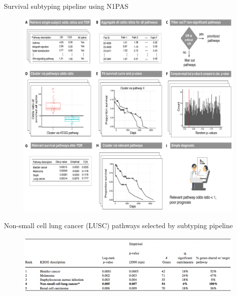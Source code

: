 \documentclass[ignorenonframetext,aspectratio=169,]{beamer}
\begin{document}
\begin{frame}{%
\protect\hypertarget{survival-subtyping-pipeline-using-n1pas}{%
Survival subtyping pipeline using N1PAS}}

\begin{figure}[htb]
  \centering \includegraphics[keepaspectratio,width=\textwidth,height=0.8\textheight]{../n1pas/figures/Figure2.jpg}
\end{figure}

\end{frame}

\begin{frame}{%
\protect\hypertarget{non-small-cell-lung-cancer-lusc-pathways-selected-by-subtyping-pipeline}{%
Non-small cell lung cancer (LUSC) pathways selected by subtyping
pipeline}}

\begin{figure}[htb]
  \centering \includegraphics[keepaspectratio,width=\textwidth,height=0.8\textheight]{../n1pas/figures/table3.png}
\end{figure}

\end{frame}
\end{document}
